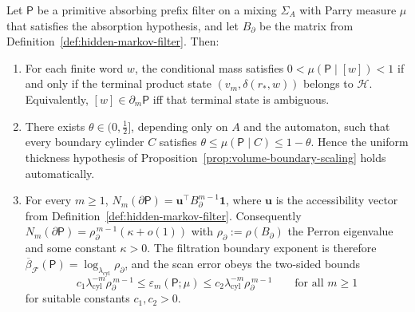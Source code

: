 \begin{theorem}
\label{thm:hidden-markov-thickness}
Let $\mathsf{P}$ be a primitive absorbing prefix filter on a mixing
$\Sigma_A$ with Parry measure $\mu$ that satisfies the absorption hypothesis,
and let $B_\partial$ be the matrix from
Definition~\ref{def:hidden-markov-filter}.  Then:
\begin{enumerate}[label=(\arabic*)]
\item For each finite word $w$, the conditional mass satisfies
  $0<\mu(\mathsf{P}\mid[w])<1$ if and only if the terminal product state
  $(v_m,\delta(r_\ast,w))$ belongs to $\mathcal{H}$.  Equivalently,
  $[w]\in\partial_m\mathsf{P}$ iff that terminal state is ambiguous.
\item There exists $\theta\in(0,\frac12]$, depending only on $A$ and the
  automaton, such that every boundary cylinder $C$ satisfies
  $\theta\le\mu(\mathsf{P}\mid C)\le 1-\theta$.  Hence the uniform thickness
  hypothesis of Proposition~\ref{prop:volume-boundary-scaling} holds automatically.
\item For every $m\ge 1$,
  $N_m(\partial\mathsf{P})=\mathbf{u}^\top B_\partial^{m-1} \mathbf{1}$, where
  $\mathbf{u}$ is the accessibility vector from
  Definition~\ref{def:hidden-markov-filter}.  Consequently
  $N_m(\partial\mathsf{P})=\rho_\partial^{\,m-1}(\kappa+o(1))$ with
  $\rho_\partial:=\rho(B_\partial)$ the Perron eigenvalue and some constant
  $\kappa>0$.  The filtration boundary exponent is therefore
  $\overline{\beta}_{\mathcal{F}}(\mathsf{P})=\log_{\lambda_{\mathrm{cyl}}}\rho_\partial$,
  and the scan error obeys the two-sided bounds
  \[
  c_1\lambda_{\mathrm{cyl}}^{-m}\rho_\partial^{\,m-1}
  \le \varepsilon_m(\mathsf{P};\mu)
  \le c_2\lambda_{\mathrm{cyl}}^{-m}\rho_\partial^{\,m-1}
  \qquad\text{for all }m\ge 1
  \]
  for suitable constants $c_1,c_2>0$.
\end{enumerate}
\end{theorem}

